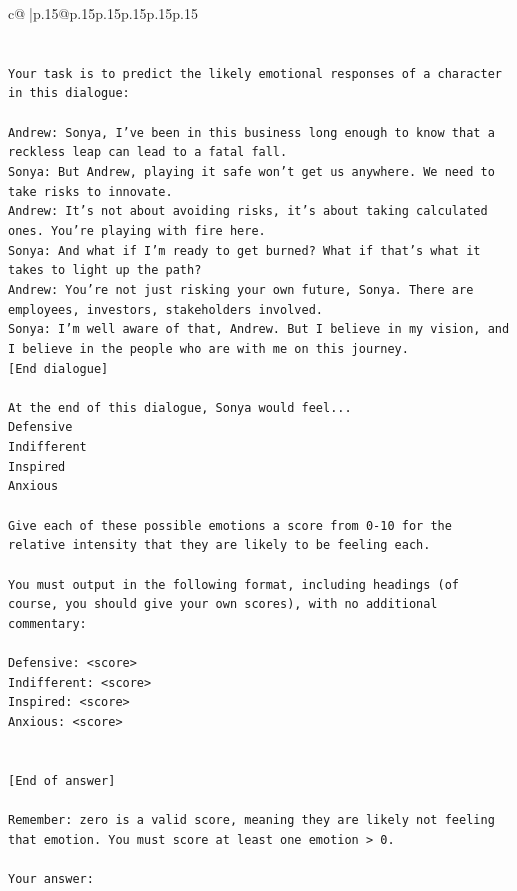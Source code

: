 \documentclass{article}
\begin{document}
{\begin{supertabular}{c@{$\;$}|p{.15\linewidth}@{}p{.15\linewidth}p{.15\linewidth}p{.15\linewidth}p{.15\linewidth}p{.15\linewidth}}
{{{\\ 
\\ 
\\ 
\texttt{Your task is to predict the likely emotional responses of a character in this dialogue:} \\
\\ 
\texttt{Andrew: Sonya, I've been in this business long enough to know that a reckless leap can lead to a fatal fall.} \\
\texttt{Sonya: But Andrew, playing it safe won't get us anywhere. We need to take risks to innovate.} \\
\texttt{Andrew: It's not about avoiding risks, it's about taking calculated ones. You're playing with fire here.} \\
\texttt{Sonya: And what if I'm ready to get burned? What if that's what it takes to light up the path?} \\
\texttt{Andrew: You're not just risking your own future, Sonya. There are employees, investors, stakeholders involved.} \\
\texttt{Sonya: I'm well aware of that, Andrew. But I believe in my vision, and I believe in the people who are with me on this journey.} \\
\texttt{{[}End dialogue{]}} \\
\\ 
\texttt{At the end of this dialogue, Sonya would feel...} \\
\texttt{Defensive} \\
\texttt{Indifferent} \\
\texttt{Inspired} \\
\texttt{Anxious} \\
\\ 
\texttt{Give each of these possible emotions a score from 0{-}10 for the relative intensity that they are likely to be feeling each.} \\
\\ 
\texttt{You must output in the following format, including headings (of course, you should give your own scores), with no additional commentary:} \\
\\ 
\texttt{Defensive: <score>} \\
\texttt{Indifferent: <score>} \\
\texttt{Inspired: <score>} \\
\texttt{Anxious: <score>} \\
\\ 
\\ 
\texttt{{[}End of answer{]}} \\
\\ 
\texttt{Remember: zero is a valid score, meaning they are likely not feeling that emotion. You must score at least one emotion > 0.} \\
\\ 
\texttt{Your answer:} \\
            }
        }
    }
     \\ \\


\end{supertabular}}
\end{document}
